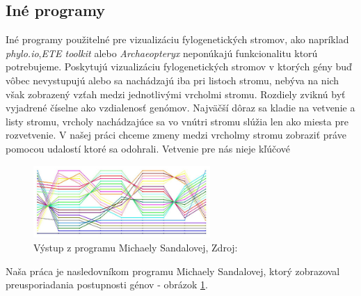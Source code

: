 \subsection{Iné programy}
Iné programy použitelné pre vizualizáciu fylogenetických stromov, ako napríklad \emph{phylo.io},\emph{ETE toolkit} alebo \emph{Archaeopteryx} neponúkajú funkcionalitu ktorú potrebujeme.
Poskytujú vizualizáciu fylogenetických stromov v ktorých gény buď vôbec nevystupujú alebo sa nachádzajú iba pri listoch stromu, 
nebýva na nich však zobrazený vzťah medzi jednotlivými vrcholmi stromu. Rozdiely zviknú byť vyjadrené číselne ako vzdialenosť genómov. 
Najväčší dôraz sa kladie na vetvenie a listy stromu, vrcholy nachádzajúce sa vo vnútri stromu slúžia len ako miesta pre rozvetvenie. 
V našej práci chceme zmeny medzi vrcholmy stromu zobraziť práve pomocou udalostí ktoré sa odohrali. Vetvenie pre nás nieje kľúčové
\begin{figure}[t]
 \centering
\includegraphics[width=0.6\textwidth]{images/sandyna}
\caption{Výstup z programu Michaely Sandalovej, Zdroj: \cite{biowiki}}\label{obr:sandyna}
\end{figure}
Naša práca je nasledovníkom programu Michaely Sandalovej, ktorý zobrazoval preusporiadania postupnosti génov - obrázok \ref{obr:sandyna}.